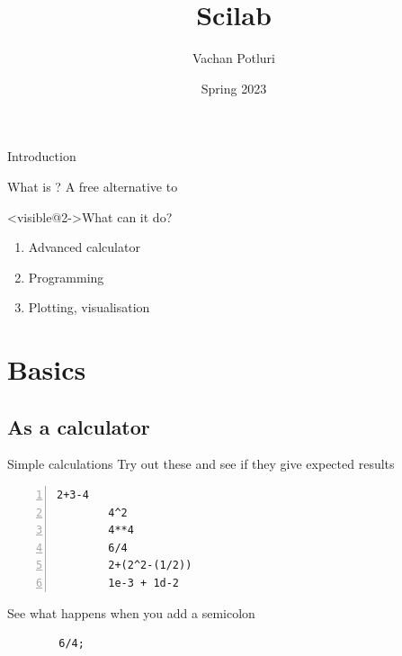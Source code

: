 





\setlength\leftmargini{1em} %
\setlength\leftmarginii{\leftmargini} %
\setlength\leftmarginiii{\leftmarginii} %

{
    \title{Scilab}
    \author[Vachan Potluri]{%
        Vachan Potluri\\
    }
    \date{Spring 2023}
    \begin{frame}
        \titlepage
    \end{frame}
}

\begin{frame}{Introduction}
    \begin{block}{What is \scilab?}
        A free alternative to \matlab
    \end{block}
    \begin{block}<visible@2->{What can it do?}
        \begin{enumerate}
            \item Advanced calculator
            \item Programming
            \item Plotting, visualisation
        \end{enumerate}
    \end{block}
\end{frame}

\section{Basics}
\subsection{As a calculator}
\begin{frame}[fragile]{Simple calculations}
    Try out these and see if they give expected results
    \begin{lstlisting}[numbers=left]
        2+3-4
        4^2
        4**4
        6/4
        2+(2^2-(1/2))
        1e-3 + 1d-2
    \end{lstlisting}
    See what happens when you add a semicolon
    \begin{lstlisting}
        6/4;
    \end{lstlisting}
\end{frame}


